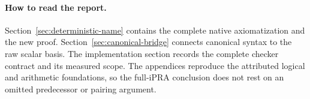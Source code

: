 \documentclass[11pt,a4paper]{article}
\theoremstyle{definition}\newtheorem{definition}[theorem]{Definition}
\theoremstyle{remark}\newtheorem{remark}[theorem]{Remark}
\begin{document}
\paragraph{How to read the report.}
Section~\ref{sec:deterministic-name} contains the complete native
axiomatization and the new proof. Section~\ref{sec:canonical-bridge}
connects canonical syntax to the raw scalar basis. The implementation
section records the complete checker contract and its measured scope.
The appendices reproduce the attributed logical and arithmetic
foundations, so the full-iPRA conclusion does not rest on an omitted
predecessor or pairing argument.
\end{document}
